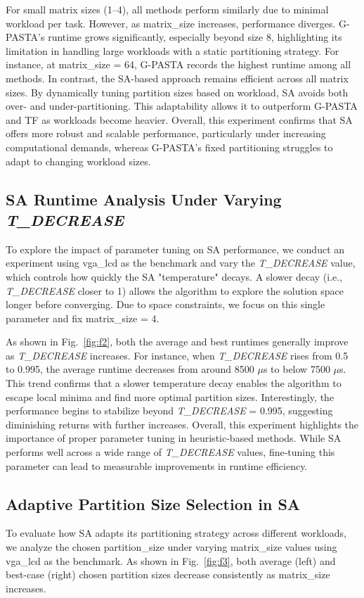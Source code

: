 \documentclass[9pt,conference]{IEEEtran}
\begin{document}
For small matrix sizes (1–4), all methods perform similarly due to minimal workload per task. 
However, as matrix\_size increases, performance diverges. G-PASTA’s runtime grows significantly, especially beyond size 8, highlighting its limitation in handling large workloads with a static partitioning strategy. 
For instance, at matrix\_size = 64, G-PASTA records the highest runtime among all methods.
In contrast, the SA-based approach remains efficient across all matrix sizes. 
By dynamically tuning partition sizes based on workload, SA avoids both over- and under-partitioning. 
This adaptability allows it to outperform G-PASTA and TF as workloads become heavier.
Overall, this experiment confirms that SA offers more robust and scalable performance, particularly under increasing computational demands, whereas G-PASTA’s fixed partitioning struggles to adapt to changing workload sizes.


\subsection{SA Runtime Analysis Under Varying \textit{T\_DECREASE}}

To explore the impact of parameter tuning on SA performance, we conduct an experiment using vga\_lcd as the benchmark and vary the \textit{T\_DECREASE} value, which controls how quickly the SA "temperature" decays. 
A slower decay (i.e., \textit{T\_DECREASE} closer to 1) allows the algorithm to explore the solution space longer before converging. Due to space constraints, we focus on this single parameter and fix matrix\_size = 4.

As shown in Fig.~\ref{fig:f2}, both the average and best runtimes generally improve as \textit{T\_DECREASE} increases. 
For instance, when \textit{T\_DECREASE} rises from 0.5 to 0.995, the average runtime decreases from around 8500 $\mu$s to below 7500 $\mu$s. 
This trend confirms that a slower temperature decay enables the algorithm to escape local minima and find more optimal partition sizes. Interestingly, the performance begins to stabilize beyond \textit{T\_DECREASE} = 0.995, suggesting diminishing returns with further increases.
Overall, this experiment highlights the importance of proper parameter tuning in heuristic-based methods. While SA performs well across a wide range of \textit{T\_DECREASE} values, fine-tuning this parameter can lead to measurable improvements in runtime efficiency.

\subsection{Adaptive Partition Size Selection in SA}

To evaluate how SA adapts its partitioning strategy across different workloads, we analyze the chosen partition\_size under varying matrix\_size values using vga\_lcd as the benchmark. 
As shown in Fig.~\ref{fig:f3}, both average (left) and best-case (right) chosen partition sizes decrease consistently as matrix\_size increases.
\end{document}
